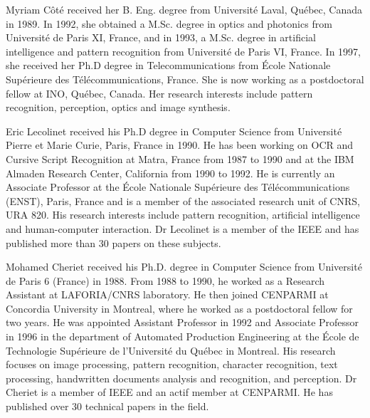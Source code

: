 \documentclass[ijdar]{svjour}
\begin{document}
\vspace*{2.31mm}


\begin{biography}
{Myriam C\^ot\'e}
received her B. Eng. degree from {Universit\'e Laval}, Qu\'ebec, Canada
in 1989. In 1992, she obtained a M.Sc. degree in optics and photonics
from {Universit\'e de Paris XI}, France, and in 1993, a M.Sc. degree in
artificial intelligence and pattern recognition from {Universit\'e de
Paris VI}, France. In 1997, she received her Ph.D degree in
Telecommunications from {\'Ecole Nationale Sup\'erieure des
T\'el\'ecommunications}, France. She is now working as a postdoctoral
fellow at INO, Qu\'ebec, Canada. Her research
interests include pattern recognition, perception, optics and image
synthesis.
\end{biography}

\newpage

\begin{biography}
{Eric Lecolinet}
received his Ph.D degree in Computer Science from {Universit\'e Pierre et Marie Curie}, Paris, France in 1990.
He has been working on OCR and Cursive Script Recognition at Matra, France from 1987 to 1990 and at the IBM Almaden Research Center, California from 1990 to 1992.
He is currently an Associate Professor at the {\'Ecole Nationale Sup\'erieure des T\'el\'ecommunications} (ENST), Paris, France and is a member of the associated research unit of CNRS, URA 820.
His research interests include pattern recognition, artificial intelligence and human-computer
interaction.\break
Dr Lecolinet is a member of the IEEE and has published more than 30 papers on these subjects.
\end{biography}


\vspace*{-9mm}

\begin{biography}
{Mohamed Cheriet}
received his Ph.D. degree in Computer Science from {Universit\'e de Paris 6} (France) in 1988.
From 1988 to 1990, he worked as a Research Assistant at LAFORIA/CNRS laboratory.
He then joined CENPARMI at Concordia University in Montreal, where he worked as a postdoctoral fellow for two years.
He was appointed Assistant Professor in 1992 and Associate Professor in 1996 in the department of Automated Production Engineering at the {\'Ecole de Technologie Sup\'erieure de l'Universit\'e du Qu\'ebec} in Montreal.
His research focuses on image processing, pattern recognition, character recognition, text processing, handwritten documents analysis and recognition, and perception.
Dr Cheriet is a member of IEEE and an actif member at CENPARMI.
He has published over 30 technical papers in the field.
\end{biography}
\end{document}
